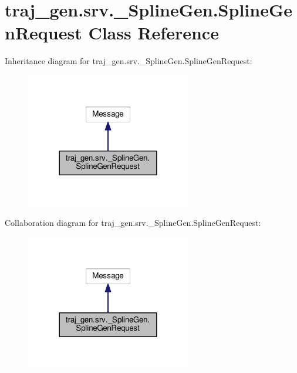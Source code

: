 \hypertarget{classtraj__gen_1_1srv_1_1___spline_gen_1_1_spline_gen_request}{}\section{traj\+\_\+gen.\+srv.\+\_\+\+Spline\+Gen.\+Spline\+Gen\+Request Class Reference}
\label{classtraj__gen_1_1srv_1_1___spline_gen_1_1_spline_gen_request}


Inheritance diagram for traj\+\_\+gen.\+srv.\+\_\+\+Spline\+Gen.\+Spline\+Gen\+Request\+:
\nopagebreak
\begin{figure}[H]
\begin{center}
\leavevmode
\includegraphics[width=204pt]{classtraj__gen_1_1srv_1_1___spline_gen_1_1_spline_gen_request__inherit__graph}
\end{center}
\end{figure}


Collaboration diagram for traj\+\_\+gen.\+srv.\+\_\+\+Spline\+Gen.\+Spline\+Gen\+Request\+:
\nopagebreak
\begin{figure}[H]
\begin{center}
\leavevmode
\includegraphics[width=204pt]{classtraj__gen_1_1srv_1_1___spline_gen_1_1_spline_gen_request__coll__graph}
\end{center}
\end{figure}

